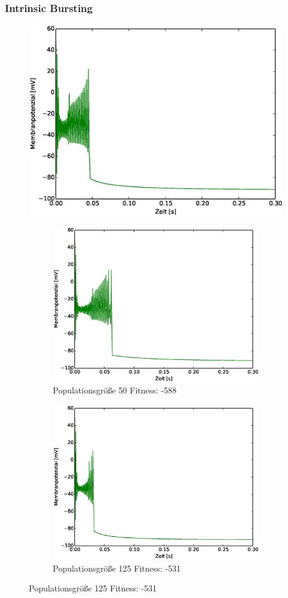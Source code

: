 \begin{frame}
  \frametitle{Intrinsic Bursting}
  \begin{figure}
    \centering
    \includegraphics[viewport=19 10 532 394,width=0.35\linewidth]{genetic/ib-pop200.eps}
    \caption*{\scriptsize{Populationsgröße 200} \tiny{Fitness: -358}}
    \begin{subfigure}{.5\textwidth}
      \centering
      \includegraphics*[viewport=19 10 532 394,width=0.7\linewidth]{genetic/ib-pop50.eps}
      \caption*{\scriptsize{Populationsgröße 50} \tiny{Fitness: -588}}
    \end{subfigure}%
    \begin{subfigure}{.5\textwidth}
      \centering
      \includegraphics*[viewport=19 10 532 394,width=0.7\linewidth]{genetic/ib-base.eps}
      \caption*{\scriptsize{Populationsgröße 125} \tiny{Fitness: -531}}
    \end{subfigure}
  \end{figure}
\end{frame}

